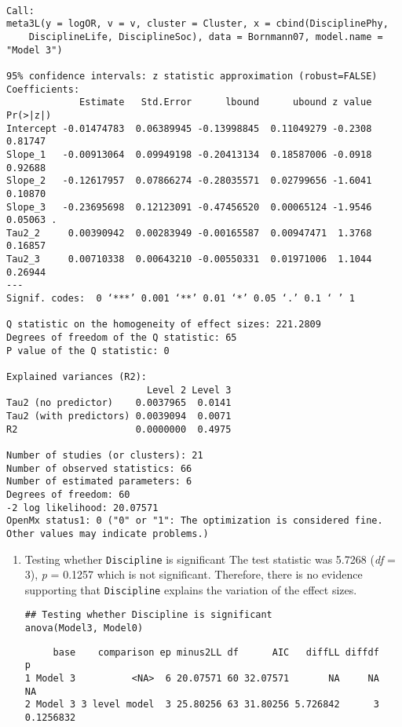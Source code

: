 \documentclass[11pt]{article}
\begin{document}
\begin{verbatim}

Call:
meta3L(y = logOR, v = v, cluster = Cluster, x = cbind(DisciplinePhy, 
    DisciplineLife, DisciplineSoc), data = Bornmann07, model.name = "Model 3")

95% confidence intervals: z statistic approximation (robust=FALSE)
Coefficients:
             Estimate   Std.Error      lbound      ubound z value Pr(>|z|)  
Intercept -0.01474783  0.06389945 -0.13998845  0.11049279 -0.2308  0.81747  
Slope_1   -0.00913064  0.09949198 -0.20413134  0.18587006 -0.0918  0.92688  
Slope_2   -0.12617957  0.07866274 -0.28035571  0.02799656 -1.6041  0.10870  
Slope_3   -0.23695698  0.12123091 -0.47456520  0.00065124 -1.9546  0.05063 .
Tau2_2     0.00390942  0.00283949 -0.00165587  0.00947471  1.3768  0.16857  
Tau2_3     0.00710338  0.00643210 -0.00550331  0.01971006  1.1044  0.26944  
---
Signif. codes:  0 ‘***’ 0.001 ‘**’ 0.01 ‘*’ 0.05 ‘.’ 0.1 ‘ ’ 1

Q statistic on the homogeneity of effect sizes: 221.2809
Degrees of freedom of the Q statistic: 65
P value of the Q statistic: 0

Explained variances (R2):
                         Level 2 Level 3
Tau2 (no predictor)    0.0037965  0.0141
Tau2 (with predictors) 0.0039094  0.0071
R2                     0.0000000  0.4975

Number of studies (or clusters): 21
Number of observed statistics: 66
Number of estimated parameters: 6
Degrees of freedom: 60
-2 log likelihood: 20.07571 
OpenMx status1: 0 ("0" or "1": The optimization is considered fine.
Other values may indicate problems.)
\end{verbatim}

\begin{enumerate}
\item Testing whether \texttt{Discipline} is significant
\label{sec:orgb08a846}
The test statistic was 5.7268 (\emph{df} = 3), \emph{p} = 0.1257 which is not significant. Therefore, there is no evidence supporting that \texttt{Discipline} explains the variation of the effect sizes.
\begin{verbatim}
## Testing whether Discipline is significant
anova(Model3, Model0)
\end{verbatim}

\begin{verbatim}
     base    comparison ep minus2LL df      AIC   diffLL diffdf         p
1 Model 3          <NA>  6 20.07571 60 32.07571       NA     NA        NA
2 Model 3 3 level model  3 25.80256 63 31.80256 5.726842      3 0.1256832
\end{verbatim}
\end{enumerate}
\end{document}
